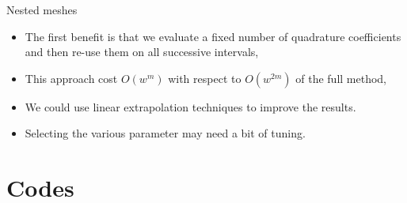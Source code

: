 \documentclass[aspectratio=169,xcolor=dvipsnames]{beamer}
\begin{document}
\begin{frame}{Nested meshes~\parencite{FordSpeedAccuracy}}

\begin{itemize}
	\item<1-> The first benefit is that we evaluate a fixed number of quadrature coefficients and then re-use them on all successive intervals,
	\item<2->[\faMoneyBillWave] This approach cost $O(w^m)$ with respect to $O(w^{2m})$ of the full method,
	\item<3->[\faCog] We could use linear extrapolation techniques to improve the results.
	\item<4->[\faCog] Selecting the various parameter may need a bit of tuning.
\end{itemize}

\end{frame}

\section{Codes}
\end{document}
